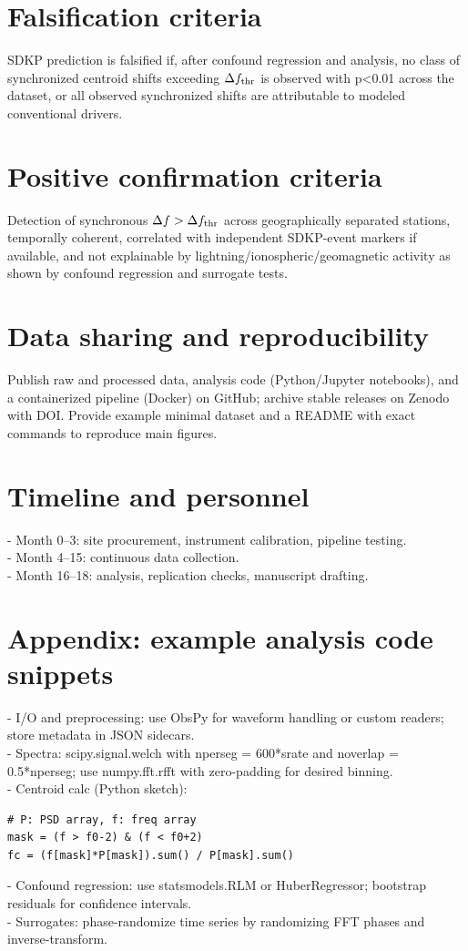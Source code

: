 \documentclass[11pt]{article}
\begin{document}
\section*{Falsification criteria}
SDKP prediction is falsified if, after confound regression and analysis, no class of synchronized centroid shifts exceeding $\Delta f_{\rm thr}$ is observed with p<0.01 across the dataset, or all observed synchronized shifts are attributable to modeled conventional drivers.

\section*{Positive confirmation criteria}
Detection of synchronous $\Delta f>\Delta f_{\rm thr}$ across geographically separated stations, temporally coherent, correlated with independent SDKP-event markers if available, and not explainable by lightning/ionospheric/geomagnetic activity as shown by confound regression and surrogate tests.

\section*{Data sharing and reproducibility}
Publish raw and processed data, analysis code (Python/Jupyter notebooks), and a containerized pipeline (Docker) on GitHub; archive stable releases on Zenodo with DOI. Provide example minimal dataset and a README with exact commands to reproduce main figures.

\section*{Timeline and personnel}
- Month 0--3: site procurement, instrument calibration, pipeline testing.\\
- Month 4--15: continuous data collection.\\
- Month 16--18: analysis, replication checks, manuscript drafting.

\section*{Appendix: example analysis code snippets}
- I/O and preprocessing: use ObsPy for waveform handling or custom readers; store metadata in JSON sidecars.\\
- Spectra: scipy.signal.welch with nperseg = 600*srate and noverlap = 0.5*nperseg; use numpy.fft.rfft with zero-padding for desired binning.\\
- Centroid calc (Python sketch):
\begin{verbatim}
# P: PSD array, f: freq array
mask = (f > f0-2) & (f < f0+2)
fc = (f[mask]*P[mask]).sum() / P[mask].sum()
\end{verbatim}
- Confound regression: use statsmodels.RLM or HuberRegressor; bootstrap residuals for confidence intervals.\\
- Surrogates: phase-randomize time series by randomizing FFT phases and inverse-transform.
\end{document}

